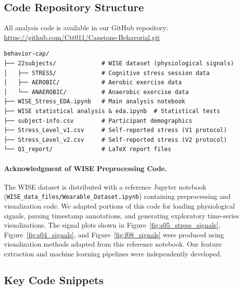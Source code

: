 \documentclass[12pt,letterpaper]{article}
\begin{document}

\clearpage




\clearpage
\makeappendix

\subsection{Code Repository Structure}

All analysis code is available in our GitHub repository: \url{https://github.com/Ctt011/Capstone-Behavorial.git}

\begin{verbatim}
behavior-cap/
├── 22subjects/             # WISE dataset (physiological signals)
│   ├── STRESS/             # Cognitive stress session data
│   ├── AEROBIC/            # Aerobic exercise data
│   └── ANAEROBIC/          # Anaerobic exercise data
├── WISE_Stress_EDA.ipynb   # Main analysis notebook
├── WISE statistical analysis & eda.ipynb  # Statistical tests
├── subject-info.csv        # Participant demographics
├── Stress_Level_v1.csv     # Self-reported stress (V1 protocol)
├── Stress_Level_v2.csv     # Self-reported stress (V2 protocol)
└── Q1_report/              # LaTeX report files
\end{verbatim}

\paragraph{Acknowledgment of WISE Preprocessing Code.} The WISE dataset is distributed with a reference Jupyter notebook (\texttt{WISE\_data\_files/Wearable\_Dataset.ipynb}) containing preprocessing and visualization code. We adapted portions of this code for loading physiological signals, parsing timestamp annotations, and generating exploratory time-series visualizations. The signal plots shown in Figure~\ref{fig:s05_stress_signals}, Figure~\ref{fig:s04_signals}, and Figure~\ref{fig:f08_signals} were produced using visualization methods adapted from this reference notebook. Our feature extraction and machine learning pipelines were independently developed.

\subsection{Key Code Snippets}
\end{document}

